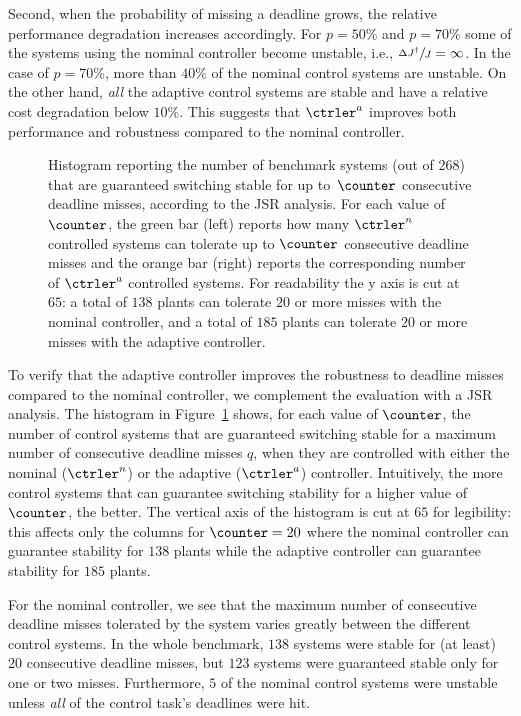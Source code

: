 Second, when the probability of missing a deadline grows, the relative performance degradation increases accordingly.
For $p=50\%$ and $p=70\%$ some of the systems using the nominal controller become unstable, i.e., $\sfrac{\Delta J^\dagger}{J} = \infty$.
In the case of $p=70\%$, more than $40\%$ of the nominal control systems are unstable.
On the other hand, \emph{all} the adaptive control systems are stable and have a relative cost degradation below $10\%$.
This suggests that $\ctrler^a$ improves both performance and robustness compared to the nominal controller.

\begin{figure}
    \centering
    
    \caption{Histogram reporting the number of benchmark systems (out of 268) that are guaranteed switching stable for up to~$\counter$ consecutive deadline misses, according to the JSR analysis.
    For each value of $\counter$, the green bar (left) reports how many $\ctrler^{n}$ controlled systems can tolerate up to $\counter$ consecutive deadline misses and the orange bar (right) reports the corresponding number of $\ctrler^{a}$ controlled systems.
    For readability the y axis is cut at $65$: a total of $138$ plants can tolerate $20$ or more misses with the nominal controller, and a total of $185$ plants can tolerate $20$ or more misses with the adaptive controller.}
    \label{fig:jsr-histogram}
\end{figure}

To verify that the adaptive controller improves the robustness to deadline misses compared to the nominal controller, we complement the evaluation with a JSR analysis.
The histogram in Figure~\ref{fig:jsr-histogram} shows, for each value of $\counter$, the number of control systems that are guaranteed switching stable for a maximum number of consecutive deadline misses $q$, when they are controlled with either the nominal ($\ctrler^n$) or the adaptive ($\ctrler^a$) controller.
Intuitively, the more control systems that can guarantee switching stability for a higher value of $\counter$, the better.
The vertical axis of the histogram is cut at $65$ for legibility: this affects only the columns for $\counter=20$ where the nominal controller can guarantee stability for $138$ plants while the adaptive controller can guarantee stability for $185$ plants.

For the nominal controller, we see that the maximum number of consecutive deadline misses tolerated by the system varies greatly between the different control systems.
In the whole benchmark, $138$ systems were stable for (at least) $20$ consecutive deadline misses, but $123$ systems were guaranteed stable only for one or two misses.
Furthermore, $5$ of the nominal control systems were unstable unless \emph{all} of the control task's deadlines were hit.

